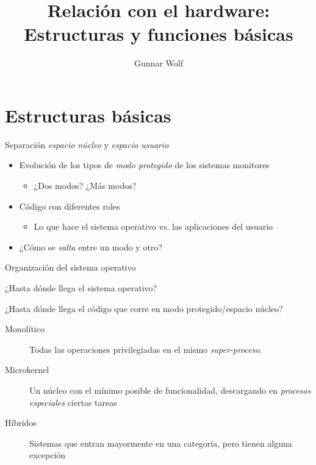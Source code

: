 \documentclass[presentation]{beamer}
\author{Gunnar Wolf}
\date{}
\title{Relación con el hardware: Estructuras y funciones básicas}
\begin{document}
\maketitle

\section{Estructuras básicas}
\label{sec:org5fe86b1}
\begin{frame}[label={sec:orgb014415}]{Separación \emph{espacio núcleo} y \emph{espacio usuario}}
\begin{itemize}
\item Evolución de los tipos de \emph{modo protegido} de los sistemas monitores
\begin{itemize}
\item ¿Dos modos? ¿Más modos?
\end{itemize}
\item Código con diferentes roles
\begin{itemize}
\item Lo que hace el sistema operativo vs. las aplicaciones del usuario
\end{itemize}
\item ¿Cómo se \emph{salta} entre un modo y otro?
\end{itemize}
\end{frame}
\begin{frame}[label={sec:orgd4df4be}]{Organización del sistema operativo}
\begin{center}
¿Hasta dónde llega el sistema operativo?

¿Hasta dónde llega el código que corre en modo protegido/espacio
núcleo?
\end{center}
\begin{description}
\item[{Monolítico}] Todas las operaciones privilegiadas en el mismo
\emph{super-proceso}.
\item[{Microkernel}] Un núcleo con el mínimo posible de funcionalidad,
descargando en \emph{procesos especiales} ciertas tareas
\item[{Híbridos}] Sistemas que entran mayormente en una categoría, pero
tienen alguna excepción
\end{description}
\end{frame}
\end{document}
